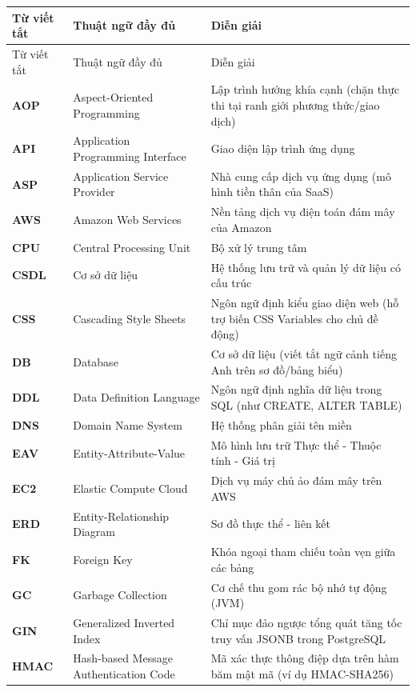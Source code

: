 \begingroup\VfourTableSetup
\begin{longtable}{P{.14\textwidth}P{.30\textwidth}P{.47\textwidth}}
\toprule Từ viết tắt & Thuật ngữ đầy đủ & Diễn giải \\
\midrule\endfirsthead
\toprule Từ viết tắt & Thuật ngữ đầy đủ & Diễn giải \\
\midrule\endhead
\textbf{AOP} & Aspect-Oriented Programming & Lập trình hướng khía cạnh (chặn thực thi tại ranh giới phương thức/giao dịch) \\
\textbf{API} & Application Programming Interface & Giao diện lập trình ứng dụng \\
\textbf{ASP} & Application Service Provider & Nhà cung cấp dịch vụ ứng dụng (mô hình tiền thân của SaaS) \\
\textbf{AWS} & Amazon Web Services & Nền tảng dịch vụ điện toán đám mây của Amazon \\
\textbf{CPU} & Central Processing Unit & Bộ xử lý trung tâm \\
\textbf{CSDL} & Cơ sở dữ liệu & Hệ thống lưu trữ và quản lý dữ liệu có cấu trúc \\
\textbf{CSS} & Cascading Style Sheets & Ngôn ngữ định kiểu giao diện web (hỗ trợ biến CSS Variables cho chủ đề động) \\
\textbf{DB} & Database & Cơ sở dữ liệu (viết tắt ngữ cảnh tiếng Anh trên sơ đồ/bảng biểu) \\
\textbf{DDL} & Data Definition Language & Ngôn ngữ định nghĩa dữ liệu trong SQL (như CREATE, ALTER TABLE) \\
\textbf{DNS} & Domain Name System & Hệ thống phân giải tên miền \\
\textbf{EAV} & Entity-Attribute-Value & Mô hình lưu trữ Thực thể - Thuộc tính - Giá trị \\
\textbf{EC2} & Elastic Compute Cloud & Dịch vụ máy chủ ảo đám mây trên AWS \\
\textbf{ERD} & Entity-Relationship Diagram & Sơ đồ thực thể - liên kết \\
\textbf{FK} & Foreign Key & Khóa ngoại tham chiếu toàn vẹn giữa các bảng \\
\textbf{GC} & Garbage Collection & Cơ chế thu gom rác bộ nhớ tự động (JVM) \\
\textbf{GIN} & Generalized Inverted Index & Chỉ mục đảo ngược tổng quát tăng tốc truy vấn JSONB trong PostgreSQL \\
\textbf{HMAC} & Hash-based Message Authentication Code & Mã xác thực thông điệp dựa trên hàm băm mật mã (ví dụ HMAC-SHA256) \\

\end{longtable}
